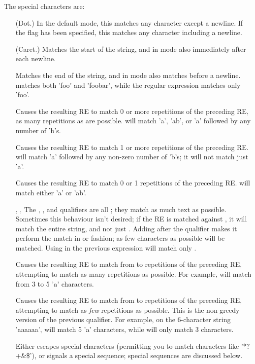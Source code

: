 The special characters are:
\begin{itemize}
\item[\code{.}] (Dot.)  In the default mode, this matches any
character except a newline.  If the  flag has been
specified, this matches any character including a newline.
\item[\code{\^}] (Caret.)  Matches the start of the string, and in
 mode also immediately after each newline.
\item[\code{\$}] Matches the end of the string, and in
 mode also matches before a newline.
 matches both 'foo' and 'foobar', while the regular
expression  matches only 'foo'.
%
\item[\code{*}] Causes the resulting RE to
match 0 or more repetitions of the preceding RE, as many repetitions
as are possible.   will
match 'a', 'ab', or 'a' followed by any number of 'b's.
%
\item[\code{+}] Causes the
resulting RE to match 1 or more repetitions of the preceding RE.
 will match 'a' followed by any non-zero number of 'b's; it
will not match just 'a'.
%
\item[\code{?}] Causes the resulting RE to
match 0 or 1 repetitions of the preceding RE.   will
match either 'a' or 'ab'.
\item[\code{*?}, \code{+?}, \code{??}] The \code{*}, \code{+}, and
 qualifiers are all ; they match as much text as
possible.  Sometimes this behaviour isn't desired; if the RE
 is matched against , it will match the
entire string, and not just .
Adding  after the qualifier makes it perform the match in
 or  fashion; as few characters as
possible will be matched.  Using  in the previous
expression will match only .
%
\item[\code{\{\var{m},\var{n}\}}] Causes the resulting RE to match from
 to  repetitions of the preceding RE, attempting to
match as many repetitions as possible.   For example,   
will match from 3 to 5 'a' characters.  
%
\item[\code{\{\var{m},\var{n}\}?}] Causes the resulting RE to
match from  to  repetitions of the preceding RE,
attempting to match as \emph{few} repetitions as possible.  This is
the non-greedy version of the previous qualifier.  For example, on the
6-character string 'aaaaaa',  will match 5 'a'
characters, while  will only match 3 characters.   
%
\item[\code{\e}] Either escapes special characters (permitting you to match
characters like '*?+\&\$'), or signals a special sequence; special
sequences are discussed below.  


\end{itemize}
